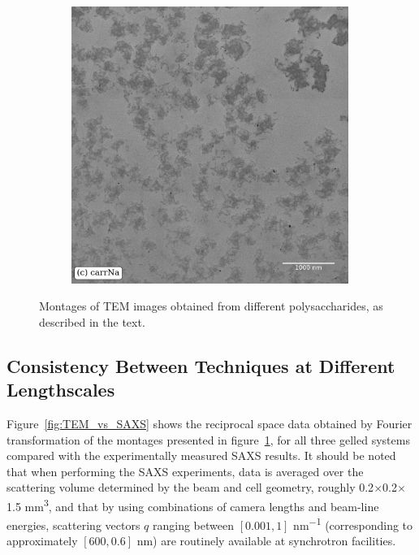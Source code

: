 \begin{figure}[!h]
\begin{subfigure}{0.32\textwidth}
  \end{subfigure}
  \begin{subfigure}{0.32\textwidth}
    \includegraphics[width=0.99\textwidth]{Figures/chapter-temsaxs/carrageenan_Na_Montage_851_scalebar_label.jpeg}
  \end{subfigure}
    \caption{Montages of TEM images obtained from different polysaccharides, as described in the text.}\label{fig:fig1}
\end{figure}

\subsection{Consistency Between Techniques at Different Lengthscales}

Figure~\ref{fig:TEM_vs_SAXS} shows the reciprocal space data obtained by Fourier transformation of the montages presented in figure~\ref{fig:fig1}, for all three gelled systems compared with the experimentally measured SAXS results. It should be noted that when performing the SAXS experiments, data is averaged over the scattering volume determined by the beam and cell geometry, roughly 0.2$\times$0.2$\times$1.5 \si{\mm^3}, and that by using combinations of camera lengths and beam-line energies, scattering vectors $q$ ranging between $[0.001, 1]$ \si{\nm^{-1}} (corresponding to approximately $[ 600, 0.6]$ \si{nm}) are routinely available at synchrotron facilities.


